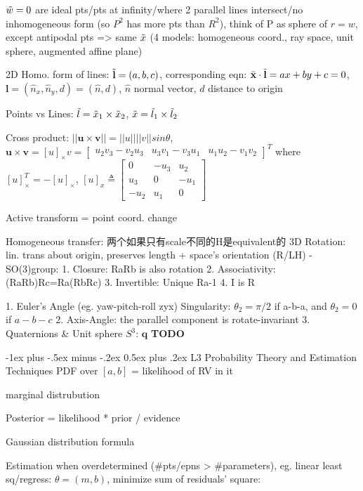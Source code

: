 \documentclass[10pt,landscape]{article}
\makeatletter
\renewcommand{\section}{\@startsection{section}{1}{0mm}%
                                {-1ex plus -.5ex minus -.2ex}%
                                {0.5ex plus .2ex}%
                                {\normalfont\large\bfseries}}
\makeatother
\begin{document}
\begin{multicols}{3}
$\Tilde{w}=0$ are ideal pts/pts at infinity/where 2 parallel lines intersect/no inhomogeneous form (so $P^2$ has more pts than $R^2$), think of P as sphere of $r=w$, except antipodal pts => same $\Tilde{x}$ (4 models: homogeneous coord., ray space, unit sphere, augmented affine plane)

2D Homo. form of lines: $\Tilde{\mathbf{l}} = (a,b,c)$, corresponding eqn: $\Bar{\mathbf{x}}\cdot \Tilde{\mathbf{l}} = ax + by +c=0$, $\mathbf{l}=(\hat{n}_x, \hat{n}_y,d) = (\hat{n}, d)$, $\hat{n}$ normal vector, $d$ distance to origin

Points vs Lines: $\Tilde{l} = \Tilde{x}_1 \times \Tilde{x}_2$, $\Tilde{x} = \Tilde{l}_1 \times \Tilde{l}_2$

Cross product: $||\mathbf{u} \times \mathbf{v}|| = ||u||||v||sin\theta$, $\mathbf{u} \times \mathbf{v} = [u]_\times v = \begin{bmatrix} u_2v_3-v_2u_3 & u_3v_1-v_3u_1 & u_1u_2-v_1v_2\end{bmatrix}^T$ where $[u]_\times^T = -[u]_\times$, $[u]_x \triangleq \begin{bmatrix} 0 & -u_3 & u_2 \\ u_3 & 0 & -u_1 \\ -u_2 & u_1 & 0\end{bmatrix}$

Active transform = point coord. change

Homogeneous transfer: 两个如果只有scale不同的H是equivalent的
3D Rotation: lin. trans about origin, preserves length + space’s orientation (R/LH) - SO(3)group:
1. Closure: RaRb is also rotation
2. Associativity: (RaRb)Rc=Ra(RbRc)
3. Invertible: Unique Ra-1  4. I is R

1. Euler’s Angle (eg. yaw-pitch-roll zyx) Singularity: $\theta_2 = \pi/2$ if a-b-a, and $\theta_2 = 0$ if $a-b-c$
2. Axis-Angle: the parallel component is rotate-invariant
3. Quaternions \& Unit sphere $S^3$: $\bm{q}$ \textbf{TODO}

\section{L3 Probability Theory and Estimation Techniques}
PDF over $[a, b]$ = likelihood of RV in it

marginal distrubution

Posterior = likelihood * prior / evidence

Gaussian distribution formula

Estimation when overdetermined (#pts/epns > #parameters), eg.  linear least sq/regress: $\theta =(m,b)$, minimize sum of residuals’ square:


\end{multicols}
\end{document}
